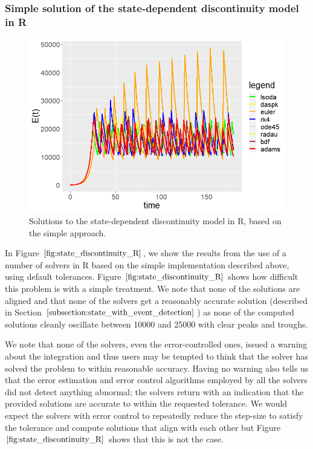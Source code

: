 \subsubsection{Simple solution of the state-dependent discontinuity model in R}
\begin{figure}[H]
\centering
\includegraphics[width=0.7\linewidth]{./figures/state_discontinuity_R}
\caption{Solutions to the state-dependent discontinuity model in R, based on the simple approach.}
\label{fig:state_discontinuity_R}
\end{figure}
In Figure $\ref{fig:state_discontinuity_R}$, we show the results from the use of a number of solvers in R based on the simple implementation described above, using default tolerances. Figure $\ref{fig:state_discontinuity_R}$ shows how difficult this problem is with a simple treatment. We note that none of the solutions are aligned and that none of the solvers get a reasonably accurate solution (described in Section $\ref{subsection:state_with_event_detection}$) as none of the computed solutions cleanly oscillate between 10000 and 25000 with clear peaks and troughs.

We note that none of the solvers, even the error-controlled ones, issued a warning about the integration and thus users may be tempted to think that the solver has solved the problem to within reasonable accuracy. Having no warning also tells us that the error estimation and error control algorithms employed by all the solvers did not detect anything abnormal; the solvers return with an indication that the provided solutions are accurate to within the requested tolerance.
We would expect the solvers with error control to repeatedly reduce the step-size to satisfy the tolerance and compute solutions that align with each other but Figure $\ref{fig:state_discontinuity_R}$ shows that this is not the case.

